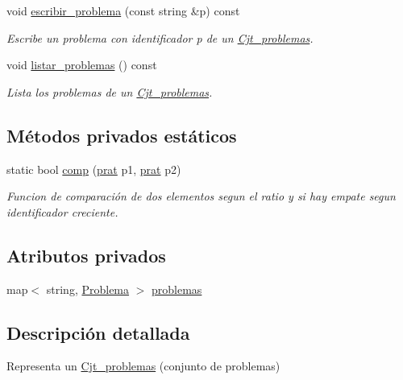 \begin{DoxyCompactItemize}
void \mbox{\hyperlink{class_cjt__problemas_a4fbbf5935069783a5ced92c5b169c330}{escribir\+\_\+problema}} (const string \&p) const
\begin{DoxyCompactList}\small\item\em Escribe un problema con identificador p de un \mbox{\hyperlink{class_cjt__problemas}{Cjt\+\_\+problemas}}. \end{DoxyCompactList}\item 
void \mbox{\hyperlink{class_cjt__problemas_a4cc09ed948f0315d5257d0d3a11e4dd5}{listar\+\_\+problemas}} () const
\begin{DoxyCompactList}\small\item\em Lista los problemas de un \mbox{\hyperlink{class_cjt__problemas}{Cjt\+\_\+problemas}}. \end{DoxyCompactList}\end{DoxyCompactItemize}
\subsection*{Métodos privados estáticos}
\begin{DoxyCompactItemize}
\item 
static bool \mbox{\hyperlink{class_cjt__problemas_ae5b468db02077990aedcd73835aaa9e1}{comp}} (\mbox{\hyperlink{struct_cjt__problemas_1_1prat}{prat}} p1, \mbox{\hyperlink{struct_cjt__problemas_1_1prat}{prat}} p2)
\begin{DoxyCompactList}\small\item\em Funcion de comparación de dos elementos segun el ratio y si hay empate segun identificador creciente. \end{DoxyCompactList}\end{DoxyCompactItemize}
\subsection*{Atributos privados}
\begin{DoxyCompactItemize}
\item 
map$<$ string, \mbox{\hyperlink{class_problema}{Problema}} $>$ \mbox{\hyperlink{class_cjt__problemas_aad49222fb63517d7d7fc3d691f045cc5}{problemas}}
\end{DoxyCompactItemize}


\subsection{Descripción detallada}
Representa un \mbox{\hyperlink{class_cjt__problemas}{Cjt\+\_\+problemas}} (conjunto de problemas) 

